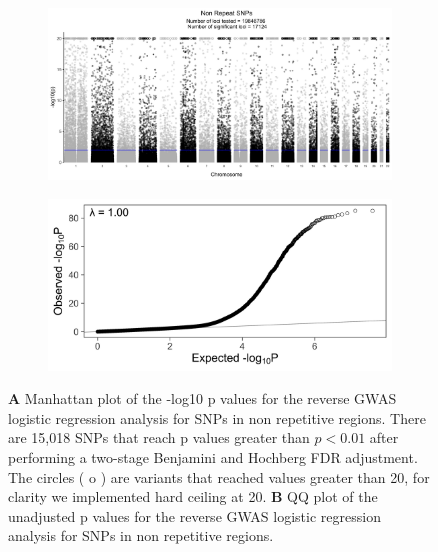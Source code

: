 \documentclass[9pt,lineno]{elife}
\begin{document}
\renewcommand{\thefigure}{S\arabic{figure}}
\setcounter{figure}{0}   	

\begin{figure} \centering
    \begin{subfigure}[b]{\linewidth}
        \includegraphics[width=\hsize]{./Figures/ManhattanPlot_NonRepeatSNPs.jpg}
        \label{fig:a}
    \end{subfigure} %

    \begin{subfigure}[b]{\linewidth}
    	\center    
        \includegraphics[width=\hsize]{./Figures/QQPlot_NonRepeatSNPs.jpg}
        \label{fig:b}    
    \end{subfigure} 
    \caption{\textbf{A} Manhattan plot of the -log10 p values for the reverse GWAS logistic regression analysis for SNPs in non repetitive regions. There are 15,018 SNPs that reach p values greater than $ p < 0.01$ after performing a two-stage Benjamini and Hochberg FDR adjustment.  The circles ( o ) are variants that reached values greater than 20, for clarity we implemented hard ceiling at 20. 
  \textbf{B} QQ plot of the unadjusted p values for the reverse GWAS logistic regression analysis for SNPs in non repetitive regions.}
  \label{NRS_Manhattan}
  \end{figure}
\end{document}
